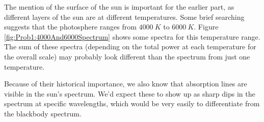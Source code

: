 \documentclass[../../PS3.tex]{subfiles}
\begin{document}
The mention of the surface of the sun is important for the earlier part, as different layers of the sun are at different temperatures. Some brief searching suggests that the photosphere ranges from $\SI{4000}{K}$ to $\SI{6000}{K}$. Figure \ref{fig:Prob1:4000And6000Spectrum} shows some spectra for this temperature range. The sum of these spectra (depending on the total power at each temperature for the overall scale) may probably look different than the spectrum from just one temperature.

Because of their historical importance, we also know that absorption lines are visible in the sun's spectrum. We'd expect these to show up as sharp dips in the spectrum at specific wavelengths, which would be very easily to differentiate from the blackbody spectrum.


\FloatBarrier

\FloatBarrier

\FloatBarrier

\FloatBarrier
\end{document}
